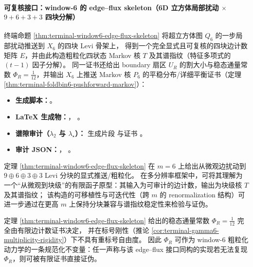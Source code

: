 \paragraph{可复核接口：window-6 的 edge--flux skeleton（6D 立方体局部扰动 \(\times\) \(9+6+3+3\) 四块分解）}
终端命题 \ref{thm:terminal-window6-edge-flux-skeleton} 将超立方体图 \(Q_6\) 的一步局部扰动推送到 \(X_6\) 的四块 Levi 骨架上，
得到一个完全显式且可复核的四块边计数矩阵 \(E\)，并由此构造粗粒化四状态 Markov 核 \(T\) 及其谱指纹（特征多项式的 \((t-1)\) 因子分解）。
同一证书还给出 boundary 扇区 \(U_R\) 的割大小与稳态通量常数 \(\Phi_R=\frac1{12}\)，并输出 \(X_6\) 上推送 Markov 核 \(P_6\) 的平稳分布/详细平衡证书（定理 \ref{thm:terminal-foldbin6-pushforward-markov}）：
\begin{itemize}
  \item \textbf{生成脚本：}\texttt{}。
  \item \textbf{LaTeX 生成物：}\texttt{}，
  \texttt{}。
  \item \textbf{谱隙审计（\(\lambda_2\) 与 \(\lambda_\star\)）：}
  \texttt{} 生成片段
  \texttt{}
  与证书 \texttt{}。
  \item \textbf{审计 JSON：}\texttt{}，
  \texttt{}。
\end{itemize}

\begin{remark}\label{rem:window6-edge-flux-coarse-graining-iterable}
定理 \ref{thm:terminal-window6-edge-flux-skeleton} 在 \(m=6\) 上给出从微观边扰动到 \(9\oplus 6\oplus 3\oplus 3\) Levi 分块的显式推送/粗粒化。
在多分辨率框架中，可将其理解为一个“从微观到块级”的有限函子原型：其输入为可审计的边计数，输出为块级核 \(T\) 及其谱指纹；
该构造的可移植性与可迭代性（跨 \(m\) 的 renormalization 结构）可进一步通过在更高 \(m\) 上保持分块兼容与谱指纹稳定性来检验与证伪。
\end{remark}

\begin{remark}[boundary 通量常数 \texorpdfstring{$\Phi_R=\tfrac1{12}$}{PhiR=1/12} 的规范不变量地位]\label{rem:window6-boundary-flux-phiR-normalization}
定理 \ref{thm:terminal-window6-edge-flux-skeleton} 给出的稳态通量常数 \(\Phi_R=\frac1{12}\) 完全由有限边计数证书决定，
并在标号刚性（推论 \ref{cor:terminal-gamma6-multiplicity-rigidity}）下不具有重标号自由度。
因此 \(\Phi_R\) 可作为 window-\(6\) 粗粒化动力学的一条规范化不变量：任一声称与该 edge--flux 接口同构的实现若无法复现 \(\Phi_R\)，则可被有限证书直接证伪。
\end{remark}

